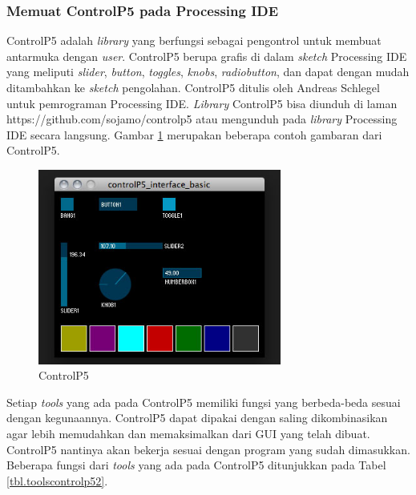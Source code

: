 \subsubsection{ Memuat ControlP5 pada Processing IDE }
ControlP5 adalah \textit{library} yang berfungsi sebagai pengontrol untuk membuat antarmuka dengan \textit{user}. ControlP5 berupa grafis di dalam \textit{sketch} Processing IDE yang meliputi \textit{slider}, \textit{button}, \textit{toggles}, \textit{knobs}, \textit{radiobutton}, dan dapat dengan mudah ditambahkan ke \textit{sketch} pengolahan. ControlP5 ditulis oleh Andreas Schlegel untuk pemrograman Processing IDE. \textit{Library} ControlP5 bisa diunduh di laman https://github.com/sojamo/controlp5 atau mengunduh pada \textit{library} Processing IDE secara langsung. Gambar \ref{pic.controlp5} merupakan beberapa contoh gambaran dari ControlP5.
\begin{figure}[H]
	\centering
	\includegraphics[width=8cm]{gambar/controlp5.jpg}
	\caption{ControlP5}
	\label{pic.controlp5}
\end{figure}
Setiap \textit{tools} yang ada pada ControlP5 memiliki fungsi yang berbeda-beda sesuai dengan kegunaannya. ControlP5 dapat dipakai dengan saling dikombinasikan agar lebih memudahkan dan memaksimalkan dari GUI yang telah dibuat. ControlP5 nantinya akan bekerja sesuai dengan program yang sudah dimasukkan. Beberapa fungsi dari \textit{tools} yang ada pada ControlP5 ditunjukkan pada Tabel \ref{tbl.toolscontrolp52}.
